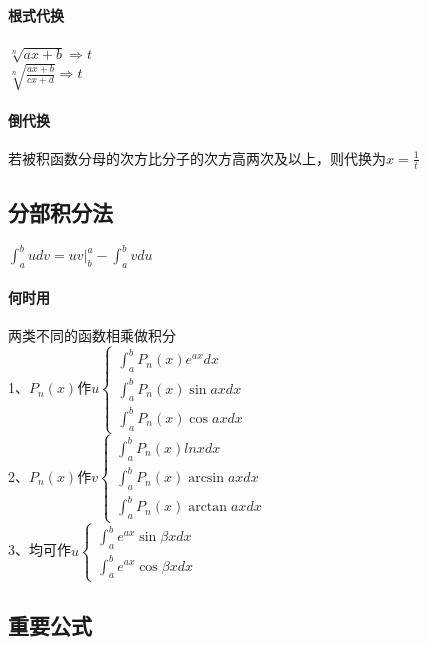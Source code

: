 \documentclass{article}
\begin{document}
\begin{flushleft}
	\paragraph{根式代换}
	$\sqrt[n]{ax+b} \Rightarrow t$\\
	$\sqrt[n]{\frac{ax+b}{cx+d}} \Rightarrow t$\\
	\paragraph{倒代换}
	若被积函数分母的次方比分子的次方高两次及以上，则代换为$x=\frac{1}{t}$\\
	
	\subsection{分部积分法}
	
	$\int_{a}^{b}udv=uv|_b^a-\int_{a}^{b}vdu$\\
	\paragraph{何时用}
	两类不同的函数相乘做积分\\
	1、$P_n(x)$作$u \left\{
	\begin{array}{lcl}
	\int_{a}^{b} P_n(x)e^{ax}dx\\
	\int_{a}^{b} P_n(x)\sin axdx\\
	\int_{a}^{b} P_n(x)\cos axdx
	\end{array} \right.$\\
	2、$P_n(x)$作$v \left\{
	\begin{array}{lcl}
	\int_{a}^{b} P_n(x)lnxdx\\
	\int_{a}^{b} P_n(x)\arcsin axdx\\
	\int_{a}^{b} P_n(x)\arctan axdx
	\end{array} \right.$\\
	3、均可作$u \left\{
	\begin{array}{lcl}
	\int_{a}^{b} e^{ax}\sin \beta xdx\\
	\int_{a}^{b} e^{ax}\cos \beta xdx
	\end{array} \right.$\\
	
	\subsection{重要公式}
	

\end{flushleft}
\end{document}
